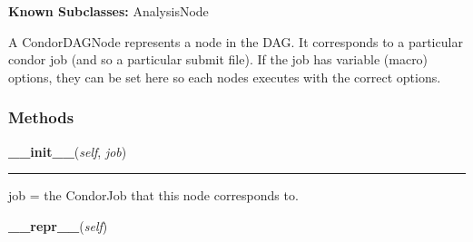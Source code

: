     \label{pipeline:CondorDAGNode}
\textbf{Known Subclasses:} AnalysisNode

A CondorDAGNode represents a node in the DAG. It corresponds to a 
particular condor job (and so a particular submit file). If the job has 
variable (macro) options, they can be set here so each nodes executes 
with the correct options.



  \subsubsection{Methods}

    \label{pipeline:CondorDAGNode:__init__}
    \vspace{0.5ex}

    \noindent\begin{boxedminipage}{\textwidth}

    \raggedright \textbf{\_\_init\_\_}(\textit{self}, \textit{job})

    \vspace{-1.5ex}

    \rule{\textwidth}{0.5\fboxrule}
    job = the CondorJob that this node corresponds to.

    \vspace{1ex}

    \end{boxedminipage}

    \label{pipeline:CondorDAGNode:__repr__}
    \vspace{0.5ex}

    \noindent\begin{boxedminipage}{\textwidth}

    \raggedright \textbf{\_\_repr\_\_}(\textit{self})

    \end{boxedminipage}

    \label{pipeline:CondorDAGNode:add_parent}
    \vspace{0.5ex}

